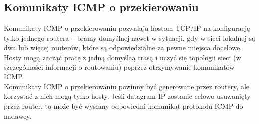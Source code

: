 \documentclass[../main.tex]{subfiles}
\begin{document}
    \subsection{Komunikaty ICMP o przekierowaniu}
    Komunikaty ICMP o przekierowaniu pozwalają hostom TCP/IP na konfigurację tylko jednego
    routera – bramy domyślnej nawet w sytuacji, gdy w sieci lokalnej są dwa lub więcej
    routerów, które są odpowiedzialne za pewne miejsca docelowe.
    Hosty mogą zacząć pracę z jedną domyślną trasą i uczyć się topologii sieci (w szczególności
    informacji o routowaniu) poprzez otrzymywanie komunikatów ICMP.\\

    Komunikaty ICMP o przekierowaniu powinny być generowane przez routery, ale korzystać z
    nich mogą tylko hosty.
    Jeśli datagram IP zostanie celowo usuwanięty przez router, to może być wysłany odpowiedni komunikat protokołu ICMP do nadawcy.
\end{document}
